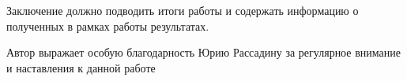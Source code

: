 
Заключение должно подводить итоги работы и содержать информацию о полученных в рамках работы результатах.

\newpage


Автор выражает особую благодарность Юрию Рассадину за регулярное внимание и наставления к данной работе